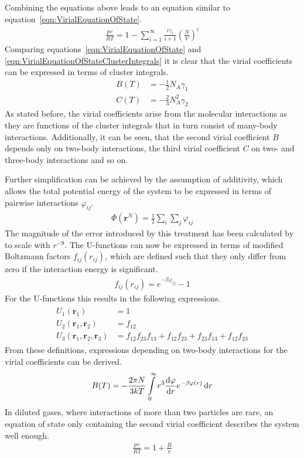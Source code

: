%
Combining the equations above leads to an equation similar to
equation~\eqref{eqn:VirialEquationOfState}.
%
\begin{align}
    \frac{pv}{RT}=1-\sum_{i=1}^\infty\frac{i\gamma_i}{i+1}\left(\frac{N}{V}\right)^i\label{eqn:VirialEquationOfStateClusterIntegrals}
\end{align}
%
Comparing equations~\eqref{eqn:VirialEquationOfState} and
\eqref{eqn:VirialEquationOfStateClusterIntegrals} it is clear that the virial
coefficients can be expressed in terms of cluster integrals.
%
\begin{align}
    B(T)&=-\frac{1}{2}N_A\gamma_1\\
    C(T)&=-\frac{2}{3}N_A^2\gamma_2
\end{align}
%
As stated before, the virial coefficients arise from the molecular interactions
as they are functions of the cluster integrals that in turn consist of
many-body interactions. Additionally, it can be seen, that the second virial
coefficient $B$ depends only on two-body interactions, the third virial
coefficient $C$ on two- and three-body interactions and so on.

Further simplification can be achieved by the assumption of additivity, which
allows the total potential energy of the system to be expressed in terms of
pairwise interactions $\varphi_{ij}$.
%
\begin{align}
    \Phi\left(\mathbf{r}^N\right)=\frac{1}{2}\sum_i\sum_j\varphi_{ij}
\end{align}
%
The magnitude of the error introduced by this treatment has been calculated by
\citeauthor{Axilrod_InteractionvanWaals_1943}\autocite{Axilrod_InteractionvanWaals_1943}
to scale with $r^{-9}$. The U-functions can now be expressed in terms of
modified Boltzmann factors $f_{ij}(r_{ij})$, which are defined such that they only differ from
zero if the interaction energy is significant.
%
\begin{align}
    f_{ij}(r_{ij})=e^{-\beta\varphi_{ij}}-1
\end{align}
%
For the U-functions this results in the following expressions.
%
\begin{align}
    \begin{aligned}
    U_1(\mathbf{r}_1)&=1\\
    U_2(\mathbf{r}_1,\mathbf{r}_2)&=f_{12}\\
    U_3(\mathbf{r}_1,\mathbf{r}_2,\mathbf{r}_3)&=f_{12}f_{23}f_{13}+f_{12}f_{23}+f_{23}f_{13}+f_{12}f_{23}
    \end{aligned}
\end{align}
%
From these definitions, expressions depending on two-body interactions for the
virial coefficients can be derived.
%
\begin{align}
    B(T)=-\frac{2\pi N}{3kT}\int\limits_0^\infty r^3\dv{\varphi}{r}e^{-\beta\varphi(r)}\dd{r}
\end{align}
%
In diluted gases, where interactions of more than two particles are rare, an
equation of state only containing the second virial coefficient describes
the system well enough.
%
\begin{align}
    \frac{pv}{RT}=1+\frac{B}{v}
\end{align}
%

